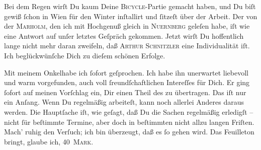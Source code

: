 \pstart
           Bei dem Regen wirſt Du kaum Deine \textsc{Bicycle}-Partie gemacht
               haben, und Du biſt gewiß ſchon in Wien für den
               Winter inſtallirt und ſitzeſt über der Arbeit. Der \label{K_L02612-3v}\label{K_L02612-3}{ }{\pb}von der \textsc{Marholm}, den ich mit Hochgenuß gleich in \textsc{Nuernberg} geleſen habe, iſt  wie eine Antwort auf unſer
               letztes Geſpräch gekommen. Jetzt wirſt Du hoffentlich lange nicht mehr daran
               zweifeln, daß \textsc{Arthur Schnitzler} eine Individualität iſt.
               Ich beglückwünſche Dich zu dieſem schönen Erfolge.\pend
           
\pstart
           Mit  meinem Onkelhabe ich ſofort geſprochen. Ich habe ihn unerwartet
               liebevoll und warm vorgefunden, auch voll ſreundſchaftlichen Intereſſes für Dich. Er
               ging ſofort auf meinen Vorſchlag ein, Dir einen Theil des \label{K_L02612-4v}\label{K_L02612-4} zu übertragen. Das iſt nur ein
               Anſang. Wenn Du regelmäßig arbeiteſt, kann noch {\pb}allerlei Anderes daraus werden. Die Hauptſache iſt, wie geſagt, daß Du die Sachen
               regelmäßig erledigſt – nicht ſür beſtimmte Termine, aber doch in beſtimmten nicht
               allzu langen Friſten. Mach’ ruhig den Verſuch; ich bin überzeugt, daß es ſo gehen
               wird. Das Feuilleton bringt, {\pb}glaube ich, \textsc{40 Mark}.\pend
           
